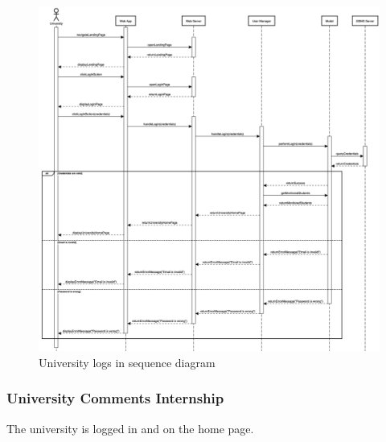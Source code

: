 \begin{figure}[h]
    \centering
    \includegraphics[width=16cm]{images/sequence-diagrams/university-logs-in.png}
    \caption{University logs in sequence diagram}
\end{figure}

\newpage
\subsubsection{University Comments Internship}
The university is logged in and on the home page.

